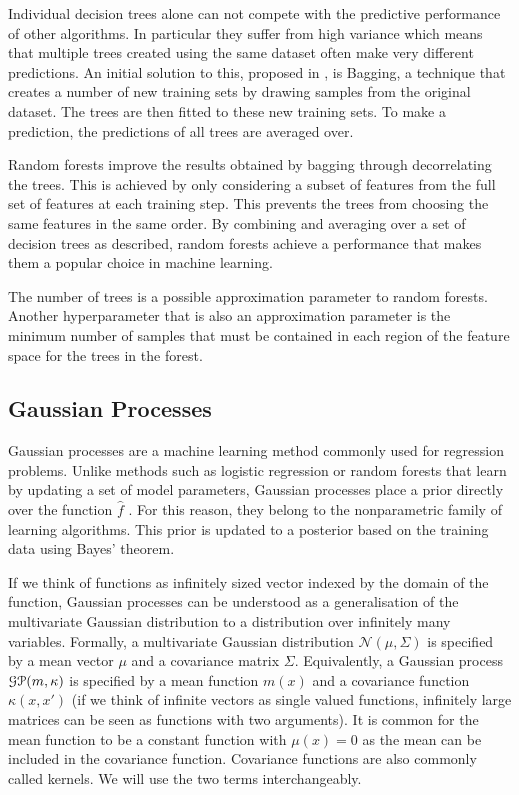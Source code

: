 \documentclass[a4paper,12pt,twoside,openright]{report}
\begin{document}
Individual decision trees alone can not compete with the predictive performance of other algorithms. In particular they suffer from high variance which means that multiple trees created using the same dataset often make very different predictions. An initial solution to this, proposed in \cite{bagging}, is Bagging, a technique that creates a number of new training sets by drawing samples from the original dataset. The trees are then fitted to these new training sets. To make a prediction, the predictions of all trees are averaged over.

Random forests improve the results obtained by bagging through decorrelating the trees. This is achieved by only considering a subset of features from the full set of features at each training step. This prevents the trees from choosing the same features in the same order. By combining and averaging over a set of decision trees as described, random forests achieve a performance that makes them a popular choice in machine learning.

The number of trees is a possible approximation parameter to random forests. Another hyperparameter that is also an approximation parameter is the minimum number of samples that must be contained in each region of the feature space for the trees in the forest.

\subsection{Gaussian Processes}
Gaussian processes are a machine learning method commonly used for regression problems. Unlike methods such as logistic regression or random forests that learn by updating a set of model parameters, Gaussian processes place a prior directly over the function $\hat{f}$ \cite{Murphy:2012:MLP:2380985}. For this reason, they belong to the nonparametric family of learning algorithms. This prior is updated to a posterior based on the training data using Bayes' theorem.

If we think of functions as infinitely sized vector indexed by the domain of the function, Gaussian processes can be understood as a generalisation of the multivariate Gaussian distribution to a distribution over infinitely many variables. Formally, a multivariate Gaussian distribution $\mathcal{N}(\mu, \Sigma)$ is specified by a mean vector $\mu$ and a covariance matrix $\Sigma$. Equivalently, a Gaussian process $\EuScript{G}\EuScript{P}(m, \kappa)$ is specified by a mean function $m(x)$ and a covariance function $\kappa(x, x')$ (if we think of infinite vectors as single valued functions, infinitely large matrices can be seen as functions with two arguments). It is common for the mean function to be a constant function with $\mu(x) = 0$ as the mean can be included in the covariance function. Covariance functions are also commonly called kernels. We will use the two terms interchangeably.
\end{document}

